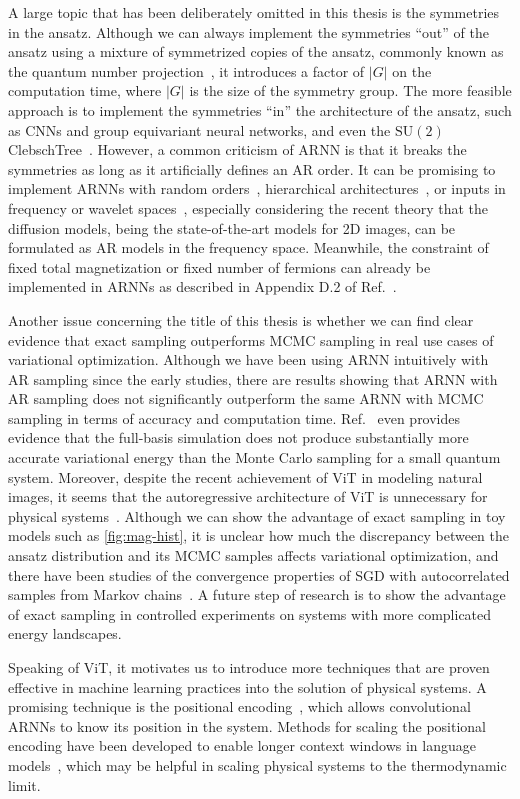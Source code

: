 A large topic that has been deliberately omitted in this thesis is the symmetries in the ansatz. Although we can always implement the symmetries ``out'' of the ansatz using a mixture of symmetrized copies of the ansatz, commonly known as the quantum number projection~\cite{tahara2008variational}, it introduces a factor of $|G|$ on the computation time, where $|G|$ is the size of the symmetry group. The more feasible approach is to implement the symmetries ``in'' the architecture of the ansatz, such as CNNs and group equivariant neural networks, and even the $\mathrm{SU}(2)$ ClebschTree~\cite{vieijra2021many}. However, a common criticism of ARNN is that it breaks the symmetries as long as it artificially defines an AR order. It can be promising to implement ARNNs with random orders~\cite{hoogeboom2022autoregressive, pannatier2024sigma, yu2024randomized}, hierarchical architectures~\cite{bialas2022hierarchical}, or inputs in frequency or wavelet spaces~\cite{nash2021generating, mattar2024wavelets}, especially considering the recent theory that the diffusion models, being the state-of-the-art models for 2D images, can be formulated as AR models in the frequency space. Meanwhile, the constraint of fixed total magnetization or fixed number of fermions can already be implemented in ARNNs as described in Appendix D.2 of Ref.~\cite{hibat2020recurrent}.

Another issue concerning the title of this thesis is whether we can find clear evidence that exact sampling outperforms MCMC sampling in real use cases of variational optimization. Although we have been using ARNN intuitively with AR sampling since the early studies, there are results showing that ARNN with AR sampling does not significantly outperform the same ARNN with MCMC sampling in terms of accuracy and computation time. Ref.~\cite{bukov2021learning} even provides evidence that the full-basis simulation does not produce substantially more accurate variational energy than the Monte Carlo sampling for a small quantum system. Moreover, despite the recent achievement of ViT in modeling natural images, it seems that the autoregressive architecture of ViT is unnecessary for physical systems~\cite{viteritti2023transformer, rende2024queries}. Although we can show the advantage of exact sampling in toy models such as \cref{fig:mag-hist}, it is unclear how much the discrepancy between the ansatz distribution and its MCMC samples affects variational optimization, and there have been studies of the convergence properties of SGD with autocorrelated samples from Markov chains~\cite{sun2018markov}. A future step of research is to show the advantage of exact sampling in controlled experiments on systems with more complicated energy landscapes.

Speaking of ViT, it motivates us to introduce more techniques that are proven effective in machine learning practices into the solution of physical systems. A promising technique is the positional encoding~\cite{ke2021rethinking}, which allows convolutional ARNNs to know its position in the system. Methods for scaling the positional encoding have been developed to enable longer context windows in language models~\cite{liu2024scaling, peng2024yarn}, which may be helpful in scaling physical systems to the thermodynamic limit.
